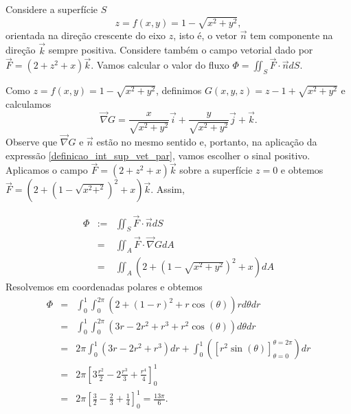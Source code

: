\begin{ex}\label{int_sup_ex_2} Considere a superfície $S$
 $$z=f(x,y)=1- \sqrt{x^2+y^2},$$
orientada na direção crescente do eixo $z$, isto é, o vetor $\vec{n}$ tem componente na direção $\vec{k}$ sempre positiva. Considere também o campo vetorial dado por
$\vec{F}=(2+z^2+x)\vec{k}$. Vamos calcular o valor do fluxo $\Phi=\iint_S\vec{F}\cdot \vec{n} dS$.

Como $z=f(x,y)=1- \sqrt{x^2+y^2}$, definimos $G(x,y,z) = z-1+ \sqrt{x^2+y^2}$ e calculamos
$$
\vec{\nabla} G=\frac{x}{\sqrt{x^2+y^2}}\vec{i}+\frac{y}{\sqrt{x^2+y^2}}\vec{j}+\vec{k}.
$$
Observe que $\vec{\nabla} G$ e $\vec{n}$ estão no mesmo sentido e, portanto, na aplicação da expressão \eqref{definicao_int_sup_vet_par}, vamos escolher o sinal positivo. Aplicamos o campo $\vec{F}=(2+z^2+x)\vec{k}$ sobre a superfície $z=0$ e obtemos $\vec{F}=(2+(1-\sqrt{x^2+^2})^2+x)\vec{k}$. Assim,


\begin{eqnarray*}
\Phi&:=&\iint_{S} \vec{F}\cdot \vec{n}dS\\
&=&\iint_A \vec{F}\cdot \vec{\nabla} G dA\\
&=&\iint_A \left(2+\left(1- \sqrt{x^2+y^2}\right)^2+x\right) dA
\end{eqnarray*}
Resolvemos em coordenadas polares e obtemos
\begin{eqnarray*}
\Phi&=&\int_0^1\int_0^{2\pi} \left(2+(1- r)^2+r\cos(\theta)\right) rd\theta dr\\
&=&\int_0^1\int_0^{2\pi} \left(3r- 2r^2 + r^3+r^2\cos(\theta)\right) d\theta dr\\
&=&2\pi\int_0^{1}\left(3r- 2r^2 + r^3\right) dr+\int_0^1\left(\left[r^2\sin(\theta)\right]_{\theta=0}^{\theta=2\pi} \right)dr \\
&=&2\pi\left[3\frac{r^2}{2}- 2\frac{r^3}{3} + \frac{r^4}{4}\right]_0^1\\
&=&2\pi\left[\frac{3}{2}- \frac{2}{3} + \frac{1}{4}\right]_0^1=\frac{13\pi}{6}.
\end{eqnarray*}

\end{ex}


